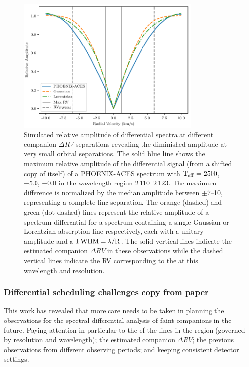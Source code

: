\begin{figure}
    \centering
    \includegraphics[width=0.8\textwidth]{figures/direct-recovery/rv_diff_final.pdf}
    \caption{Simulated relative amplitude of differential spectra at different companion \(\Delta RV\) separations revealing the diminished amplitude at very small orbital separations.
    The solid blue line shows the maximum relative amplitude of the differential signal (from a shifted copy of itself) of a {PHOENIX-ACES} spectrum with \(\textrm{T}_{\mathrm{eff}}{}=2500\)\K{}, \logg{}=5.0, \feh{}=0.0 in the wavelength region 2\,110--2\,123\nm{}.
    The maximum difference is normalized by the median amplitude between \(\pm7\)--10\kmps{}, representing a complete line separation.
    The orange (dashed) and green (dot-dashed) lines represent the relative amplitude of a spectrum differential for a spectrum containing a single Gaussian or Lorentzian absorption line respectively, each with a unitary amplitude and a \(\rm {\textrm{FWHM}} = \lambda / R\).
    The solid vertical lines indicate the estimated companion \(\Delta {RV}\) in these observations while the dashed vertical lines indicate the {RV} corresponding to the {\fwhm} at this wavelength and resolution.}
    \label{fig:diff_amp}
\end{figure}








\subsubsection{Differential scheduling challenges {copy from paper}}
\label{subsubsec:differential-schedualing}
This work has revealed that more care needs to be taken in planning the observations for the spectral differential analysis of faint companions in the future.
Paying attention in particular to the {\fwhm} of the lines in the region (governed by resolution and wavelength); the estimated companion \(\Delta {RV}\); the previous observations from different observing periods; and keeping consistent detector settings.

